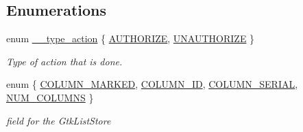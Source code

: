 \subsection*{Enumerations}
\begin{DoxyCompactItemize}
\item 
enum \hyperlink{usb-gui_8c_a4a517367fd55e0e2fab7fa26d5f6cc57}{\_\-\_\-type\_\-action} \{ \hyperlink{usb-gui_8c_a4a517367fd55e0e2fab7fa26d5f6cc57a7daed806ef87774bc0276855b435d28c}{AUTHORIZE}, 
\hyperlink{usb-gui_8c_a4a517367fd55e0e2fab7fa26d5f6cc57aa27a3c7ab0b97672a8c6bb7ba181840e}{UNAUTHORIZE}
 \}
\begin{DoxyCompactList}\small\item\em Type of action that is done. \item\end{DoxyCompactList}\item 
enum \{ \hyperlink{usb-gui_8c_a06fc87d81c62e9abb8790b6e5713c55ba237841854e4e21628727932d38fdf4c5}{COLUMN\_\-MARKED}, 
\hyperlink{usb-gui_8c_a06fc87d81c62e9abb8790b6e5713c55bad42963e993a0d76e1a2511cf50b17c79}{COLUMN\_\-ID}, 
\hyperlink{usb-gui_8c_a06fc87d81c62e9abb8790b6e5713c55ba0f37881f7ff6971ea31dad00acbd4510}{COLUMN\_\-SERIAL}, 
\hyperlink{usb-gui_8c_a06fc87d81c62e9abb8790b6e5713c55ba94a1900486855d9c85622e2c106104a9}{NUM\_\-COLUMNS}
 \}
\begin{DoxyCompactList}\small\item\em field for the GtkListStore \item\end{DoxyCompactList}\end{DoxyCompactItemize}
